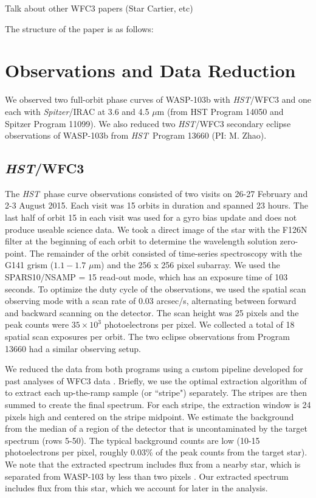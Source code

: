 \documentclass[twocolumn]{aastex61}
\newcommand{\project}[1]{\textsl{#1}}
\newcommand{\HST}{\project{HST}}
\newcommand{\Spitzer}{\project{Spitzer}}
\begin{document}
Talk about other WFC3 papers (Star Cartier, etc)

The structure of the paper is as follows:

\section{Observations and Data Reduction}
We observed two full-orbit phase curves of WASP-103b with \HST/WFC3 and one each with \Spitzer/IRAC at 3.6 and 4.5 $\mu$m (from HST Program 14050 and Spitzer Program 11099). We also reduced two \HST/WFC3 secondary eclipse observations of WASP-103b from \HST\ Program 13660 (PI: M. Zhao).

\subsection{\HST/WFC3}
The \HST\ phase curve observations consisted of two visits on 26-27 February and 2-3 August 2015. Each visit was 15 orbits in duration and spanned 23 hours. The last half of orbit 15 in each visit was used for a gyro bias update and does not produce useable science data.  We took a direct image of the star with the F126N filter at the beginning of each orbit to determine the wavelength solution zero-point. The remainder of the orbit consisted of time-series spectroscopy with the G141 grism ($1.1 - 1.7$ $\mu$m) and the 256 x 256 pixel subarray. We used the SPARS10/NSAMP = 15 read-out mode, which has an exposure time of 103 seconds. To optimize the duty cycle of the observations, we used the spatial scan observing mode with a scan rate of 0.03 arcsec/s, alternating between forward and backward scanning on the detector. The scan height was 25 pixels and the peak counts were $35\times10^3$ photoelectrons per pixel. We collected a total of 18 spatial scan exposures per orbit.  The two eclipse observations from Program 13660 had a similar observing setup.  

We reduced the data from both programs using a custom pipeline developed for past analyses of WFC3 data \citep[for details see][]{kreidberg14a, kreidberg14b, kreidberg15b}. Briefly, we use the optimal extraction algorithm of \cite{horne86} to extract each up-the-ramp sample (or ``stripe") separately. The stripes are then summed to create the final spectrum. For each stripe, the extraction window is 24 pixels high and centered on the stripe midpoint. We estimate the background from the median of a region of the detector that is uncontaminated by the target spectrum (rows 5-50). The typical background counts are low (10-15 photoelectrons per pixel, roughly 0.03\% of the peak counts from the target star). We note that the extracted spectrum includes flux from a nearby star, which is separated from WASP-103 by less than two pixels \citep[0.2";][]{wollert15}. Our extracted spectrum includes flux from this star, which we account for later in the analysis. 
\end{document}
